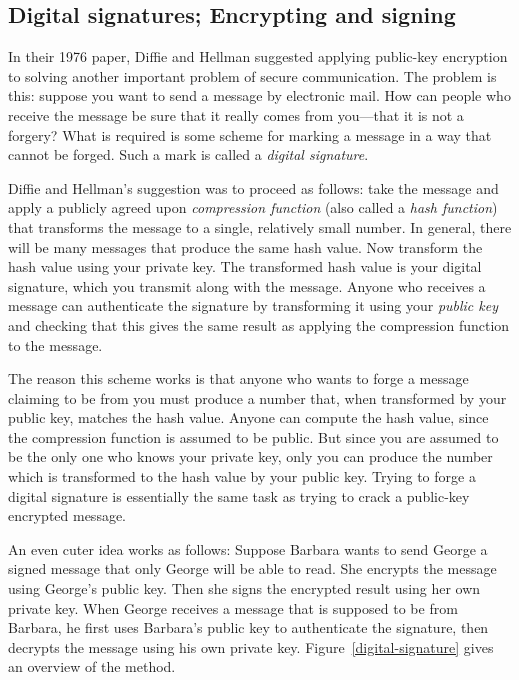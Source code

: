 \subsection{Digital signatures; Encrypting and signing}

In their 1976 paper, Diffie and Hellman suggested applying public-key
encryption to solving another important problem of secure
communication.  The problem is this: suppose you want to send a
message by electronic mail.  How can people who receive the message be
sure that it really comes from you---that it is not a forgery?  What
is required is some scheme for marking a message in a way that cannot
be forged.  Such a mark is called a {\it digital signature}.

Diffie and Hellman's suggestion was to proceed as follows: take the
message and apply a publicly agreed upon {\it compression function}
(also called a {\it hash function}) that transforms the message to a
single, relatively small number.  In general, there will be many
messages that produce the same hash value.  Now transform the hash
value using your private key.  The transformed hash value is your
digital signature, which you transmit along with the message.  Anyone
who receives a message can authenticate the signature by transforming
it using your {\it public key} and checking that this gives the same
result as applying the compression function to the message.

The reason this scheme works is that anyone who wants to forge a
message claiming to be from you must produce a number that, when
transformed by your public key, matches the hash value.  Anyone can
compute the hash value, since the compression function is assumed to
be public.  But since you are assumed to be the only one who knows
your private key, only you can produce the number which is
transformed to the hash value by your public key.  Trying to forge a
digital signature is essentially the same task as trying to crack a
public-key encrypted message.

An even cuter idea works as follows: Suppose Barbara wants to send
George a signed message that only George will be able to read.  She
encrypts the message using George's public key.  Then she signs the
encrypted result using her own private key.  When George receives a
message that is supposed to be from Barbara, he first uses Barbara's
public key to authenticate the signature, then decrypts the message
using his own private key.  Figure~\ref{digital-signature} gives an
overview of the method.

